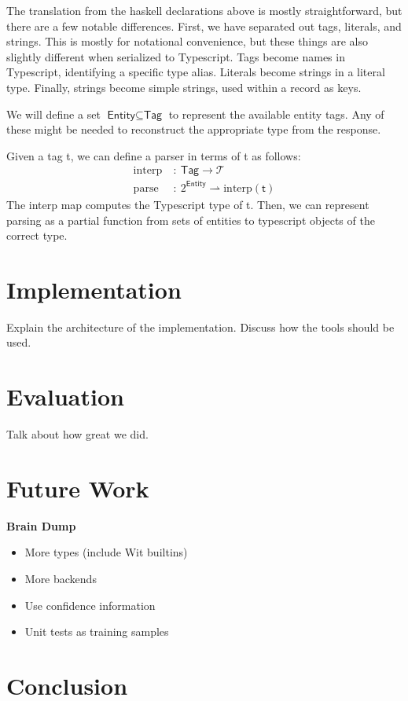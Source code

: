 \documentclass[twocolumn]{article}
\newcommand{\fcy}[1]{\mathcal{#1}}
\newcommand{\etag}[1]{\textsf{#1}}
\begin{document}
The translation from the haskell declarations above is mostly straightforward,
but there are a few notable differences. First, we have separated out tags,
literals, and strings. This is mostly for notational convenience, but these
things are also slightly different when serialized to Typescript. Tags become
names in Typescript, identifying a specific type alias. Literals become strings
in a literal type. Finally, strings become simple strings, used within a record
as keys.

We will define a set $\textsf{Entity} \subseteq \textsf{Tag}$ to represent the
available entity tags. Any of these might be needed to reconstruct the
appropriate type from the response.

Given a tag \etag{t}, we can define a parser in terms of \etag{t} as follows:
\begin{align*}
  \text{interp}\ &:\ \textsf{Tag} \rightarrow \fcy{T} \\
  \text{parse}\ &:\ 2^{\textsf{Entity}} \rightharpoonup \text{interp}(\etag{t})
\end{align*}
The interp map computes the Typescript type of \etag{t}. Then, we can represent
parsing as a partial function from sets of entities to typescript objects of the
correct type.

\section{Implementation} \label{implementation}
Explain the architecture of the implementation. Discuss how the tools should be
used.

\section{Evaluation} \label{evaluation}
Talk about how great we did.

\section{Future Work} \label{future}
{\bf Brain Dump}
\begin{itemize}
\item More types (include Wit builtins)
\item More backends
\item Use confidence information
\item Unit tests as training samples
\end{itemize}

\section{Conclusion} \label{conclusion}
\end{document}
